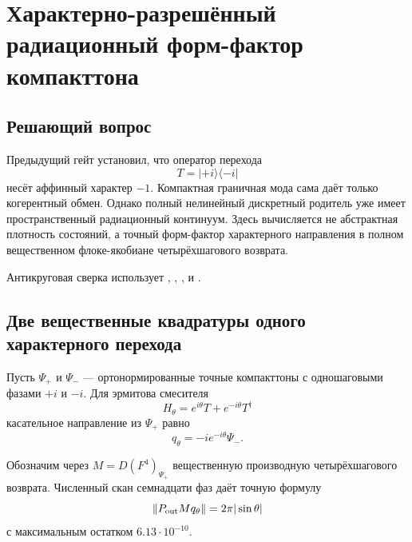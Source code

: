\chapter{Характерно-разрешённый радиационный форм-фактор компакттона}
\label{ch:v6-spectral-transition-discrete-compacton-character-resolved-radiation-form-factor-gate}

\section{Решающий вопрос}

Предыдущий гейт установил, что оператор перехода
\begin{equation}
 T=|+i\rangle\langle-i|
\end{equation}
несёт аффинный характер $-1$. Компактная граничная мода сама даёт только
когерентный обмен. Однако полный нелинейный дискретный родитель уже имеет
пространственный радиационный континуум. Здесь вычисляется не абстрактная
плотность состояний, а точный форм-фактор характерного направления в
полном вещественном флоке-якобиане четырёхшагового возврата.

Антикруговая сверка использует
,
,
,
и
.

\section{Две вещественные квадратуры одного характерного перехода}

Пусть $\Psi_+$ и $\Psi_-$ --- ортонормированные точные компакттоны с
одношаговыми фазами $+i$ и $-i$. Для эрмитова смесителя
\begin{equation}
 H_\theta=e^{i\theta}T+e^{-i\theta}T^\dagger
\end{equation}
касательное направление из $\Psi_+$ равно
\begin{equation}
 q_\theta=-i e^{-i\theta}\Psi_-.
 \label{eq:v6-character-radiation-quadrature}
\end{equation}

Обозначим через $M=D(F^4)_{\Psi_+}$ вещественную производную
четырёхшагового возврата. Численный скан семнадцати фаз даёт точную
формулу
\begin{equation}
 \|P_{\rm out}Mq_\theta\|
 =2\pi|\sin\theta|
 \label{eq:v6-character-radiation-sine-law}
\end{equation}
с максимальным остатком $6.13\cdot10^{-10}$.


